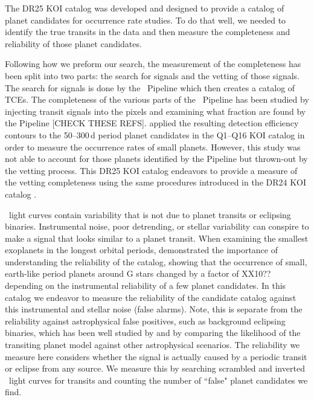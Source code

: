 The DR25 KOI catalog was developed and designed to provide a catalog of planet candidates for occurrence rate studies. To do that well, we needed to identify the true transits in the data and then measure the completeness and reliability of those planet candidates. 

Following how we preform our search, the measurement of the completeness has been split into two parts: the search for signals and the vetting of those signals. The search for signals is done by the \Kepler\ Pipeline which then creates a catalog of TCEs.  The completeness of the various parts of the \Kepler\ Pipeline has been studied by injecting transit signals into the pixels and examining what fraction are found by the Pipeline \citep{Christiansen2015b,Christiansen2013a}[CHECK THESE REFS]. \citet{Burke2015} applied the resulting detection efficiency contours to the 50--300\,d period planet candidates in the Q1--Q16 KOI catalog \citep{Mullally2015cat} in order to measure the occurrence rates of small planets. However, this study was not able to account for those planets identified by the Pipeline but thrown-out by the vetting process. This DR25 KOI catalog endeavors to provide a measure of the vetting completeness using the same procedures introduced in the DR24 KOI catalog \citep{Coughlin2016}. 

\Kepler\ light curves contain variability that is not due to planet transits or eclipsing binaries.  Instrumental noise, poor detrending, or stellar variability can conspire to make a signal that looks similar to a planet transit. When examining the smallest exoplanets in the longest orbital periods, \citet{Burke2015} demonstrated the importance of understanding the reliability of the catalog, showing that the occurrence of small, earth-like period planets around G stars changed by a factor of XX10?? depending on the instrumental reliability of a few planet candidates.  In this catalog we endeavor to measure the reliability of the candidate catalog against this instrumental and stellar noise (false alarms).  Note, this is separate from the reliability against astrophysical false positives, such as background eclipsing binaries, which has been well studied by \citet{Morton2016} and \citet{Torres2012} by comparing the likelihood of the transiting planet model against other astrophysical scenarios. The reliability we measure here considers whether the signal is actually caused by a periodic transit or eclipse from any source. We measure this by searching scrambled and inverted \Kepler\ light curves for transits and counting the number of ``false" planet candidates we find.

